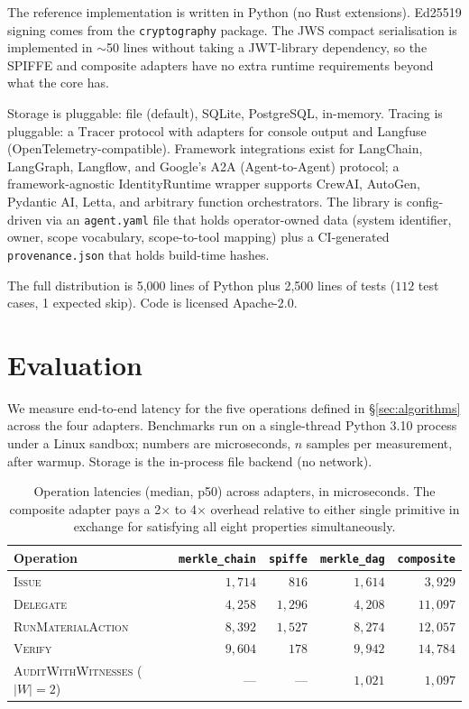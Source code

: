 \documentclass[11pt,a4paper]{article}
\begin{document}
The reference implementation is written in Python (no Rust extensions).
Ed25519 signing comes from the \texttt{cryptography} package. The JWS
compact serialisation is implemented in $\sim$50 lines without taking a
JWT-library dependency, so the SPIFFE and composite adapters have no
extra runtime requirements beyond what the core has.

Storage is pluggable: file (default), SQLite, PostgreSQL, in-memory.
Tracing is pluggable: a $\mathrm{Tracer}$ protocol with adapters for
console output and Langfuse (OpenTelemetry-compatible). Framework
integrations exist for LangChain, LangGraph, Langflow, and Google's A2A
(Agent-to-Agent) protocol; a framework-agnostic
$\mathrm{IdentityRuntime}$ wrapper supports CrewAI, AutoGen, Pydantic
AI, Letta, and arbitrary function orchestrators. The library is
config-driven via an \texttt{agent.yaml} file that holds operator-owned
data (system identifier, owner, scope vocabulary, scope-to-tool mapping)
plus a CI-generated \texttt{provenance.json} that holds build-time
hashes.

The full distribution is 5,000 lines of Python plus 2,500 lines of tests
($112$ test cases, 1 expected skip). Code is licensed Apache-2.0.

\section{Evaluation}\label{sec:eval}

We measure end-to-end latency for the five operations defined in
\S\ref{sec:algorithms} across the four adapters. Benchmarks run on a
single-thread Python 3.10 process under a Linux sandbox; numbers are
microseconds, $n$ samples per measurement, after warmup. Storage is the
in-process file backend (no network).

\begin{table}[t]
\centering
\small
\caption{Operation latencies (median, p50) across adapters, in microseconds. The composite adapter pays a 2$\times$ to 4$\times$ overhead relative to either single primitive in exchange for satisfying all eight properties simultaneously.}\label{tab:latency}
\begin{tabular}{l r r r r}
\toprule
Operation & \texttt{merkle\_chain} & \texttt{spiffe} & \texttt{merkle\_dag} & \texttt{composite} \\
\midrule
\textsc{Issue}                  & $1{,}714$  & $816$    & $1{,}614$  & $3{,}929$   \\
\textsc{Delegate}               & $4{,}258$  & $1{,}296$ & $4{,}208$  & $11{,}097$  \\
\textsc{RunMaterialAction}      & $8{,}392$  & $1{,}527$ & $8{,}274$  & $12{,}057$  \\
\textsc{Verify}                 & $9{,}604$  & $178$    & $9{,}942$  & $14{,}784$  \\
\textsc{AuditWithWitnesses} ($|W|{=}2$)
                                & ---        & ---      & $1{,}021$  & $1{,}097$   \\
\bottomrule
\end{tabular}
\end{table}
\end{document}
